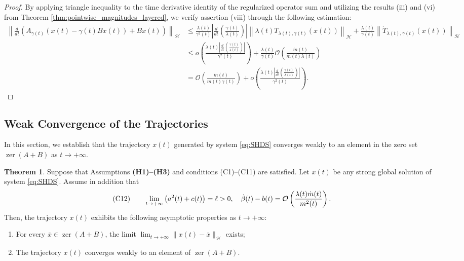 \documentclass{article}
\theoremstyle{definition}
\newtheorem{theorem}{Theorem}[section]
\theoremstyle{definition}
\theoremstyle{definition}
\begin{document}
\begin{proof}
\noindent By applying triangle inequality to the time derivative identity of the regularized operator sum and utilizing the results {\rm (iii)} and {\rm (vi)} from Theorem \ref{thm:pointwise_magnitudes_layered}, we verify assertion {\rm (viii)} through the following estimation:
\begin{equation*}
\begin{aligned}
\left\|\frac{d}{dt}\left(A_{\gamma(t)}\left(x(t)-\gamma(t)Bx(t)\right)+Bx(t)\right)\right\|_{\mathcal{H}} 
&\le \frac{\lambda(t)}{\gamma^2(t)} \left| \frac{d}{dt} \left( \frac{\gamma(t)}{\lambda(t)} \right) \right| \left\| \lambda(t) T_{\lambda(t), \gamma(t)}(x(t)) \right\|_{\mathcal{H}} + \frac{\lambda(t)}{\gamma(t)} \left\| \dot{T}_{\lambda(t), \gamma(t)}(x(t)) \right\|_{\mathcal{H}} \\
&\le o\left( \frac{\lambda(t) \left| \frac{d}{dt} \left( \frac{\gamma(t)}{\lambda(t)} \right) \right|}{\gamma^2(t)} \right) + \frac{\lambda(t)}{\gamma(t)} \mathcal{O}\left( \frac{\dot{m}(t)}{m(t) \lambda(t)} \right) \\
&= \mathcal{O}\left( \frac{\dot{m}(t)}{m(t) \gamma(t)} \right) + o\left( \frac{\lambda(t) \left| \frac{d}{dt} \left( \frac{\gamma(t)}{\lambda(t)} \right) \right|}{\gamma^2(t)} \right).
\end{aligned}
\end{equation*}
\end{proof}

\subsection{Weak Convergence of the Trajectories}
\label{sec:weak_convergence}

In this section, we establish that the trajectory $x(t)$ generated by system \eqref{eq:SHDS} converges weakly to an element in the zero set $\operatorname{zer}(A+B)$ as $t \to +\infty$.

\begin{theorem}
\label{thm:weak_convergence_final}
Suppose that Assumptions {\rm {\bf (H1)--(H3)}} and conditions (C1)--(C11) are satisfied. Let $x(t)$ be any strong global solution of system \eqref{eq:SHDS}. Assume in addition that
\[
\text{\rm (C12)}\qquad
\lim_{t\to+\infty}\big(a^2(t)+c(t)\big)=\ell>0,\quad
\dot{\beta}(t)-b(t)=\mathcal{O}\left(\frac{\lambda(t)\dot m(t)}{m^2(t)}\right).
\]
Then, the trajectory $x(t)$ exhibits the following asymptotic properties as $t \to +\infty$:
\begin{enumerate}[label=(\roman*)]
    \item For every $\bar{x} \in \operatorname{zer}(A+B)$, the limit $\lim_{t \to +\infty} \|x(t) - \bar{x}\|_{\mathcal{H}}$ exists;
    \item The trajectory $x(t)$ converges weakly to an element of $\operatorname{zer}(A+B)$.
\end{enumerate}
\end{theorem}
\end{document}
